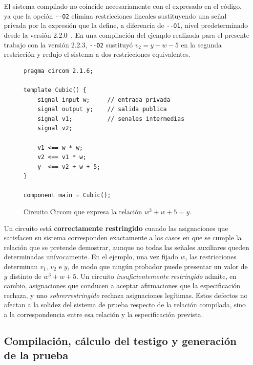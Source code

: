 El sistema compilado no coincide necesariamente con el expresado en el código, ya que la opción
\lstinline|--O2| elimina restricciones lineales sustituyendo una señal privada por la expresión
que la define, a diferencia de \lstinline|--O1|, nivel predeterminado desde la versión
2.2.0~\cite{circomdocs, circomreleases}. En una compilación del ejemplo realizada para el
presente trabajo con la versión 2.2.3, \lstinline|--O2| sustituyó $v_2 = y - w - 5$ en la segunda
restricción y redujo el sistema a dos restricciones equivalentes.

\begin{figure}[htbp]
	\centering
	\begin{minipage}{0.8\textwidth}
		\begin{lstlisting}[language=Circom]
pragma circom 2.1.6;

template Cubic() {
    signal input w;     // entrada privada
    signal output y;    // salida publica
    signal v1;          // senales intermedias
    signal v2;

    v1 <== w * w;
    v2 <== v1 * w;
    y  <== v2 + w + 5;
}

component main = Cubic();
\end{lstlisting}
	\end{minipage}
	\caption{Circuito Circom que expresa la relación $w^{3} + w + 5 = y$.}
	\label{fig:circom_cubico}
\end{figure}

Un circuito está \textbf{correctamente restringido} cuando las asignaciones que satisfacen su
sistema corresponden exactamente a los casos en que se cumple la relación que se pretende
demostrar, aunque no todas las señales auxiliares queden determinadas unívocamente. En el
ejemplo, una vez fijado $w$, las restricciones determinan $v_1$, $v_2$ e $y$, de modo que ningún
probador puede presentar un valor de $y$ distinto de $w^{3} + w + 5$. Un circuito
\textit{insuficientemente restringido} admite, en cambio, asignaciones que conducen a aceptar
afirmaciones que la especificación rechaza, y uno \textit{sobrerrestringido} rechaza asignaciones
legítimas. Estos defectos no afectan a la solidez del sistema de prueba respecto de la relación
compilada, sino a la correspondencia entre esa relación y la especificación prevista.

\subsection{Compilación, cálculo del testigo y generación de la prueba}
\label{sec:circom_flujo}

